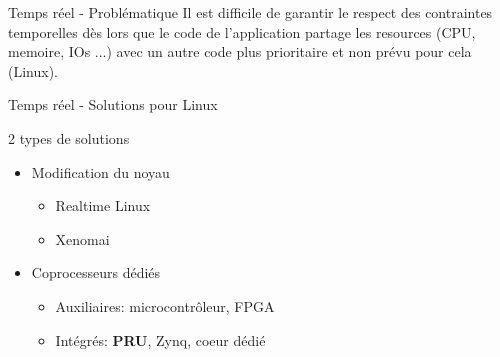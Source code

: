 \documentclass{beamer}
\begin{document}
\begin{frame}{Temps r\'eel - Probl\'ematique}
  Il est difficile de garantir le respect des contraintes temporelles d\`es
  lors que le code de l'application partage les resources (CPU, memoire, IOs ...)
  avec un autre code plus prioritaire et non pr\'evu pour cela (Linux).
\end{frame}


\begin{frame}{Temps r\'eel - Solutions pour Linux}

  2 types de solutions

  \begin{itemize}
  \item Modification du noyau
    \begin{itemize}
    \item Realtime Linux
    \item Xenomai
    \end{itemize}

  \item Coprocesseurs d\'edi\'es
    \begin{itemize}
    \item Auxiliaires: microcontr\^oleur, FPGA
    \item Int\'egr\'es: \textbf{PRU}, Zynq, coeur d\'edi\'e
    \end{itemize}

  \end{itemize}
\end{frame}
\end{document}
